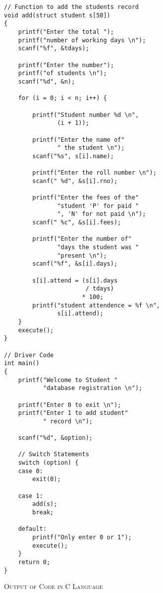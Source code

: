 \documentclass{report}
\begin{document}
\begin{verbatim}
// Function to add the students record
void add(struct student s[50])
{
    printf("Enter the total ");
    printf("number of working days \n");
    scanf("%f", &tdays);
 
    printf("Enter the number");
    printf("of students \n");
    scanf("%d", &n);
 
    for (i = 0; i < n; i++) {
 
        printf("Student number %d \n",
               (i + 1));
 
        printf("Enter the name of"
               " the student \n");
        scanf("%s", s[i].name);
 
        printf("Enter the roll number \n");
        scanf(" %d", &s[i].rno);
 
        printf("Enter the fees of the"
               "student 'P' for paid "
               ", 'N' for not paid \n");
        scanf(" %c", &s[i].fees);
 
        printf("Enter the number of"
               "days the student was "
               "present \n");
        scanf("%f", &s[i].days);
 
        s[i].attend = (s[i].days
                       / tdays)
                      * 100;
        printf("student attendence = %f \n",
               s[i].attend);
    }
    execute();
}
 
// Driver Code
int main()
{
    printf("Welcome to Student "
           "database registration \n");
 
    printf("Enter 0 to exit \n");
    printf("Enter 1 to add student"
           " record \n");
 
    scanf("%d", &option);
 
    // Switch Statements
    switch (option) {
    case 0:
        exit(0);
 
    case 1:
        add(s);
        break;
 
    default:
        printf("Only enter 0 or 1");
        execute();
    }
    return 0;
}\end{verbatim}

\hfill

\begin{center}
	\textsc{\LARGE{Output of Code in C Language}}
\end{center}

\hfill
\end{document}
